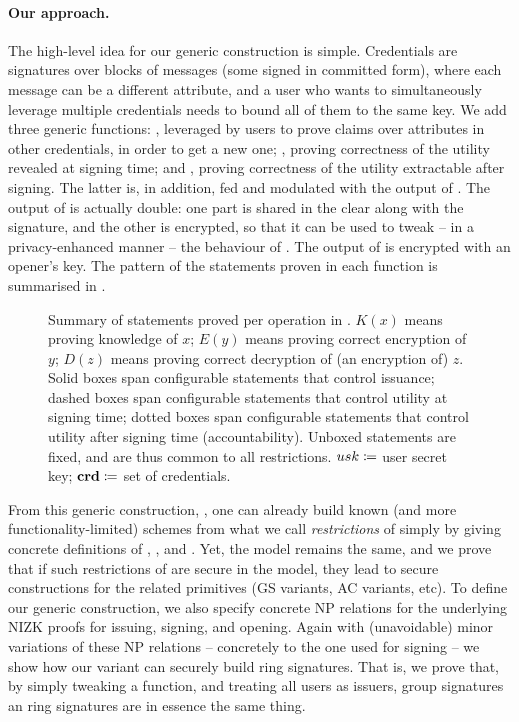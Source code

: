 \paragraph{Our approach.} %
The high-level idea for our generic construction is simple. Credentials are
signatures over blocks of messages (some signed in committed form), where each
message can be a different attribute, and a user who wants to simultaneously
leverage multiple credentials needs to bound all of them to the same key. We add
three generic functions: \fissue, leveraged by users to
prove claims over attributes in other credentials, in order to get a new one;
\feval, proving correctness of the utility revealed at signing time; and \finsp,
proving correctness of the utility extractable after signing. The latter is, in
addition, fed and modulated with the output of \feval. The output of \feval is
actually double: one part is shared in the clear along with the signature, and
the other is encrypted, so that it can be used to tweak -- in a privacy-enhanced
manner -- the behaviour of \finsp. The output of \finsp is encrypted with an
opener's key. The pattern of the statements proven in each function is
summarised in .

\begin{figure}[ht!]
  \centering
  
  \caption{Summary of statements proved per operation in \UAS.
    $K(x)$ means proving knowledge of $x$; $E(y)$ means proving correct
    encryption of $y$; $D(z)$ means proving correct decryption of (an encryption
    of) $z$. Solid boxes span configurable statements that control issuance;
    dashed boxes span configurable statements that control utility at signing
    time; dotted boxes span configurable statements that control utility after
    signing time (accountability). Unboxed statements are fixed, and are thus
    common to all \UAS restrictions. $usk \coloneqq$ user secret key; $\mathbf{crd}
    \coloneqq$ set of credentials.}
  \label{fig:proof-blocks-uas}
\end{figure}

From this generic construction, \CUASGen, one can already build known (and more
functionality-limited) schemes from what we call \emph{restrictions} of
\CUASGen simply by giving concrete definitions of \fissue, \feval, and \finsp.
Yet, the model remains the same, and we prove that if such restrictions of
\CUASGen are secure in the \UAS model, they lead to secure constructions for
the related primitives (GS variants, AC variants, etc). To define our generic
construction, we also specify concrete NP relations for the underlying NIZK
proofs for issuing, signing, and opening. Again with (unavoidable) minor variations
of these NP relations -- concretely to the one used for signing -- we show how
our \CUASGen variant can securely build ring signatures. That is, we prove that,
by simply tweaking a function, and treating all users as issuers, group
signatures an ring signatures are in essence the same thing.

